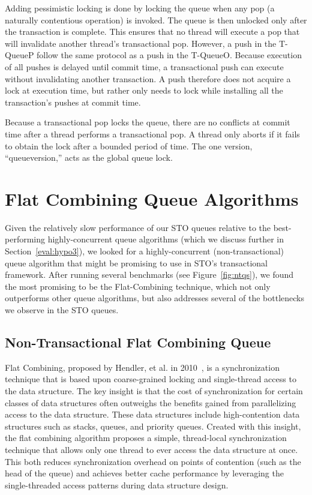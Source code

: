 Adding pessimistic locking is done by locking the queue when any pop (a naturally contentious operation) is invoked. The queue is then unlocked only after the transaction is complete. This ensures that no thread will execute a pop that will invalidate another thread's transactional pop. However, a push in the T-QueueP follow the same protocol as a push in the T-QueueO. Because execution of all pushes is delayed until commit time, a transactional push can execute without invalidating another transaction. A push therefore does not acquire a lock at execution time, but rather only needs to lock while installing all the transaction's pushes at commit time. 

Because a transactional pop locks the queue, there are no conflicts at commit time after a thread performs a transactional pop. A thread only aborts if it fails to obtain the lock after a bounded period of time. The one version, ``queueversion,'' acts as the global queue lock. 


\section{Flat Combining Queue Algorithms}
Given the relatively slow performance of our STO queues relative to the best-performing highly-concurrent queue algorithms (which we discuss further in Section~\ref{eval:hypo3}), we looked for a highly-concurrent (non-transactional) queue algorithm that might be promising to use in STO's transactional framework. After running several benchmarks (see Figure~\ref{fig:ntqs}), we found the most promising to be the Flat-Combining technique, which not only outperforms other queue algorithms, but also addresses several of the bottlenecks we observe in the STO queues.

\subsection{Non-Transactional Flat Combining Queue}
\label{fcqueuent}

Flat Combining, proposed by Hendler, et al. in 2010~\cite{flatcombining}, is a synchronization technique that is based upon coarse-grained locking and single-thread access to the data structure. The key insight is that the cost of synchronization for certain classes of data structures often outweighs the benefits gained from parallelizing access to the data structure. These data structures include high-contention data structures such as stacks, queues, and priority queues. Created with this insight, the flat combining algorithm proposes a simple, thread-local synchronization technique that allows only one thread to ever access the data structure at once. This both reduces synchronization overhead on points of contention (such as the head of the queue) and achieves better cache performance by leveraging the single-threaded access patterns during data structure design.

